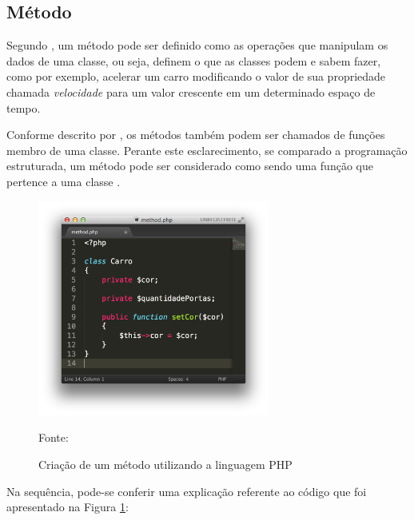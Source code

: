 \subsection{Método}

Segundo , um
método pode ser definido como as operações que manipulam os dados de uma
classe, ou seja, definem o que as classes podem e sabem fazer, como por exemplo,
acelerar um carro modificando o valor de sua propriedade chamada
\textit{velocidade} para um valor crescente em um determinado espaço de tempo.

Conforme descrito por , os métodos também podem ser
chamados de funções membro de uma classe. Perante este esclarecimento, se
comparado a programação estruturada, um método pode ser considerado como
sendo uma função que pertence a uma classe \cite{programmingPhp}.

\begin{figure}[h!tb]
	\caption{Criação de um método utilizando a linguagem PHP}
	\label{fig:metodo}

	\centering
	\includegraphics[width=0.68\textwidth]{images/method.png}

	\centering
	\footnotesize Fonte: \fonteOAutor
\end{figure}

\FloatBarrier 	%

Na sequência, pode-se conferir uma explicação referente ao código que foi
apresentado na Figura \ref{fig:metodo}:

